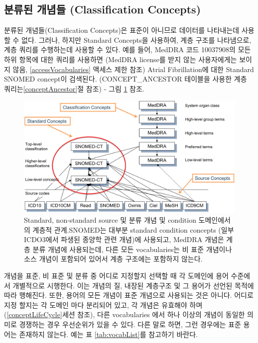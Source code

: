 \documentclass[11pt]{book}
\theoremstyle{definition}
\theoremstyle{definition}
\theoremstyle{definition}
\theoremstyle{remark}
\begin{document}
\subsection{분류된 개념들 (Classification
Concepts)}\label{--classification-concepts}

분류된 개념들(Classification Concepts)은 표준이 아니므로 데이터를
나타내는데 사용할 수 없다. 그러나, 하지만 Standard Concepts을 사용하여,
계층 구조를 나타냄으로, 계층 쿼리를 수행하는데 사용할 수 있다. 예를
들어, MedDRA 코드 10037908의 모든 하위 항목에 대한 쿼리를 사용하면
(MedDRA license를 받지 않는 사용자에게는 보이지 않음,
\ref{accessVocabularies} 액세스 제한 참조) Atrial Fibrillation에 대한
Standard SNOMED concept이 검색된다. (CONCEPT\_ANCESTOR 테이블을 사용한
계층 쿼리는\ref{conceptAncestor}절 참조) - 그림 \ref{fig:hierarchy}
참조. 

\begin{figure}

{\centering \includegraphics[width=1\linewidth]{images/StandardizedVocabularies/hierarchy} 

}

\caption{Standard, non-standard source 및 분류 개념 및 condition 도메인에서의 계층적 관계.SNOMED는 대부분 standard condition concepts (일부 ICDO3에서 파생된 종양학 관련 개념)에 사용되고, MedDRA 개념은 계층 분류 개념에 사용되는데, 다른 모든 vocabularies는 비 표준 개념이나 소스 개념이 포함되어 있어서 계층 구조에는 포함하지 않는다.}\label{fig:hierarchy}
\end{figure}

개념을 표준, 비 표준 및 분류 중 어디로 지정할지 선택할 때 각 도메인에
용어 수준에서 개별적으로 시행한다. 이는 개념의 질, 내장된 계층구조 및 그
용어가 선언된 목적에 따라 행해진다. 또한, 용어의 모든 개념이 표준
개념으로 사용되는 것은 아니다. 어디로 지정 할지는 각 도메인 마다
분리되어 있고, 각 개념은 유효해야 하며 (\ref{conceptLifeCycle}세션
참조), 다른 vocabularies 에서 하나 이상의 개념이 동일한 의미로 경쟁하는
경우 우선순위가 있을 수 있다. 다른 말로 하면, 그런 경우에는 표준 용어는
존재하지 않는다. 예는 표 \ref{tab:vocabList}를 참고하기 바란다.
\end{document}
